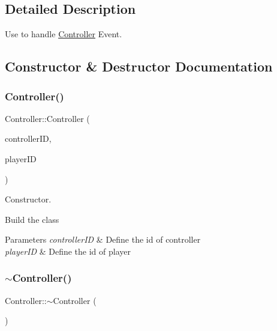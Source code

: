 \subsection{Detailed Description}
Use to handle \hyperlink{classController}{Controller} Event. 

\subsection{Constructor \& Destructor Documentation}
\mbox{\label{classController_af2b33f3f5b26f33b9d226d24d3fd5e84}} 
\subsubsection{\texorpdfstring{Controller()}{Controller()}}
{\footnotesize\ttfamily Controller\+::\+Controller (\begin{DoxyParamCaption}\item[{const Unsigned\+Int}]{controller\+ID,  }\item[{const Unsigned\+Int}]{player\+ID }\end{DoxyParamCaption})}



Constructor. 

Build the class


\begin{DoxyParams}{Parameters}
{\em controller\+ID} & Define the id of controller\\
\hline
{\em player\+ID} & Define the id of player \\
\hline
\end{DoxyParams}
\mbox{\label{classController_a0ab87934c4f7a266cfdb86e0f36bc1b5}} 
\subsubsection{\texorpdfstring{$\sim$\+Controller()}{~Controller()}}
{\footnotesize\ttfamily Controller\+::$\sim$\+Controller (\begin{DoxyParamCaption}{ }\end{DoxyParamCaption})}



